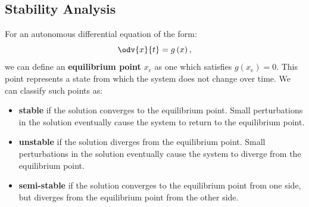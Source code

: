 \documentclass{article}
\begin{document}
\subsection{Stability Analysis}
For an autonomous differential equation of the form:
\begin{equation*}
    \odv{x}{t} = g\left( x \right),
\end{equation*}
we can define an \textbf{equilibrium point} \(x_e\) as one which
satisfies \(g\left( x_e \right) = 0\). This point represents a
state from which the system does not change over time. We can classify
such points as:
\begin{itemize}
    \item \textbf{stable} if the solution converges to the equilibrium
          point. Small perturbations in the solution eventually
          cause the system to return to the equilibrium point.
    \item \textbf{unstable} if the solution diverges from the
          equilibrium point. Small perturbations in the solution
          eventually cause the system to diverge from the
          equilibrium point.
    \item \textbf{semi-stable} if the solution converges to the
          equilibrium point from one side, but diverges from the
          equilibrium point from the other side.
\end{itemize}
\end{document}
